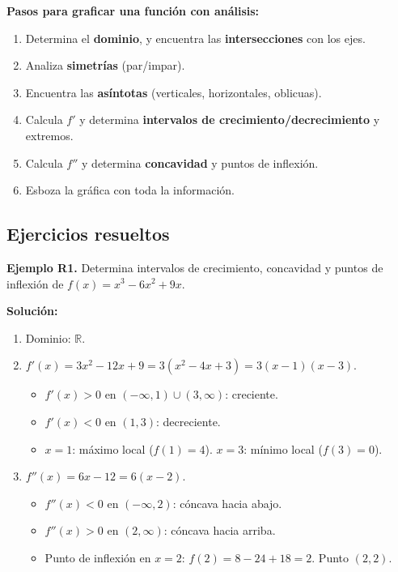 \documentclass[12pt, a4paper]{article}
\begin{document}
\begin{cuadropasos}
  \textbf{Pasos para graficar una función con análisis:}
  \begin{enumerate}
    \item Determina el \textbf{dominio}, y encuentra las \textbf{intersecciones} con los ejes.
    \item Analiza \textbf{simetrías} (par/impar).
    \item Encuentra las \textbf{asíntotas} (verticales, horizontales, oblicuas).
    \item Calcula $f'$ y determina \textbf{intervalos de crecimiento/decrecimiento} y extremos.
    \item Calcula $f''$ y determina \textbf{concavidad} y puntos de inflexión.
    \item Esboza la gráfica con toda la información.
  \end{enumerate}
\end{cuadropasos}

\subsection{Ejercicios resueltos}

\textbf{Ejemplo R1.} Determina intervalos de crecimiento, concavidad y puntos de inflexión de $f(x) = x^3 - 6x^2 + 9x$.

\begin{cuadrosolucion}
  \textbf{Solución:}
  \begin{enumerate}
    \item Dominio: $\mathbb{R}$.
    \item $f'(x) = 3x^2 - 12x + 9 = 3(x^2 - 4x + 3) = 3(x - 1)(x - 3)$.
          \begin{itemize}
            \item $f'(x) > 0$ en $(-\infty, 1) \cup (3, \infty)$: creciente.
            \item $f'(x) < 0$ en $(1, 3)$: decreciente.
            \item $x = 1$: máximo local ($f(1) = 4$). $x = 3$: mínimo local ($f(3) = 0$).
          \end{itemize}
    \item $f''(x) = 6x - 12 = 6(x - 2)$.
          \begin{itemize}
            \item $f''(x) < 0$ en $(-\infty, 2)$: cóncava hacia abajo.
            \item $f''(x) > 0$ en $(2, \infty)$: cóncava hacia arriba.
            \item Punto de inflexión en $x = 2$: $f(2) = 8 - 24 + 18 = 2$. Punto $(2, 2)$.
          \end{itemize}
  \end{enumerate}
\end{cuadrosolucion}
\end{document}
